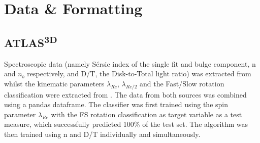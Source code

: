 \section{Data \& Formatting}
\subsection{ATLAS\textsuperscript{3D}}
Spectroscopic data (namely S\'ersic index of the single fit and bulge component, n and $n_{b}$ respectively,  and D/T, the Disk-to-Total light ratio) was extracted from \cite{Krajnovic2013} whilst the kinematic parameters $\lambda_{Re}$, $\lambda_{Re/2}$ and the Fast/Slow rotation classification were extracted from \cite{Emsellem2011}. The data from both sources was combined using a pandas dataframe.
The classifier was first trained using the spin parameter $\lambda_{Re}$ with the FS rotation classification as target variable as a test measure, which successfully predicted 100\% of the test set. 
The algorithm was then trained using n and D/T individually and simultaneously.
